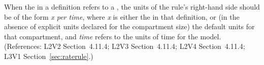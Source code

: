 When the  in a \RateRule definition refers to a
\Compartment, the units of the rule's right-hand side should be of the form
\emph{x per time}, where \emph{x} is either the  in that
\Compartment definition, or (in the absence of explicit units declared for
the compartment size) the default units for that compartment, and
\emph{time} refers to the units of time for the model.  (References: L2V2
Section~4.11.4; L2V3 Section~4.11.4; L2V4 Section~4.11.4; L3V1 Section~\ref{sec:raterule}.)
